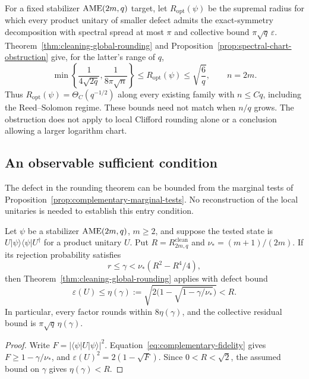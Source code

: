 \begin{remark}
\label{rem:radius-sandwich}
For a fixed stabilizer \(\mathrm{AME}(2m,q)\) target, let \(R_{\mathrm{opt}}(\psi)\)
be the supremal radius for which every product unitary of smaller defect
admits the exact-symmetry decomposition with spectral spread at most \(\pi\)
and collective bound \(\pi\sqrt q\,\varepsilon\).
Theorem~\ref{thm:cleaning-global-rounding} and
Proposition~\ref{prop:spectral-chart-obstruction} give, for the latter's
range of \(q\),
\[
 \min\left\{\frac1{4\sqrt{2q}},\frac1{8\pi\sqrt n}\right\}
 \leq R_{\mathrm{opt}}(\psi)\leq\sqrt{\frac6q},\qquad n=2m.
\]
Thus \(R_{\mathrm{opt}}(\psi)=\Theta_C(q^{-1/2})\) along every existing
family with \(n\leq Cq\), including the Reed--Solomon regime.  These bounds
need not match when \(n/q\) grows.  The obstruction does not apply to local
Clifford rounding alone or a conclusion allowing a larger logarithm chart.
\end{remark}

\subsection{An observable sufficient condition}

The defect in the rounding theorem can be bounded from the marginal tests
of Proposition~\ref{prop:complementary-marginal-tests}.  No reconstruction
of the local unitaries is needed to establish this entry condition.

\begin{corollary}
\label{cor:marginal-certified-rounding}
Let \(\psi\) be a stabilizer \(\mathrm{AME}(2m,q)\), \(m\geq2\), and suppose
the tested state is \(U|\psi\rangle\langle\psi|U^\dagger\) for a product
unitary \(U\).  Put \(R=R^{\mathrm{clean}}_{2m,q}\) and
\(\nu_*=(m+1)/(2m)\).  If its rejection probability satisfies
\[
 r\leq\gamma<\nu_*(R^2-R^4/4),
\]
then Theorem~\ref{thm:cleaning-global-rounding} applies with defect bound
\[
 \varepsilon(U)\leq\eta(\gamma)
   :=\sqrt{2\bigl(1-\sqrt{1-\gamma/\nu_*}\bigr)}<R.
\]
In particular, every factor rounds within \(8\eta(\gamma)\), and the
collective residual bound is \(\pi\sqrt q\,\eta(\gamma)\).
\end{corollary}

\begin{proof}
Write \(F=|\langle\psi|U|\psi\rangle|^2\).
Equation~\eqref{eq:complementary-fidelity} gives \(F\geq1-\gamma/\nu_*\),
and \(\varepsilon(U)^2=2(1-\sqrt F)\).  Since \(0<R<\sqrt2\), the
assumed bound on \(\gamma\) gives \(\eta(\gamma)<R\).
\end{proof}

